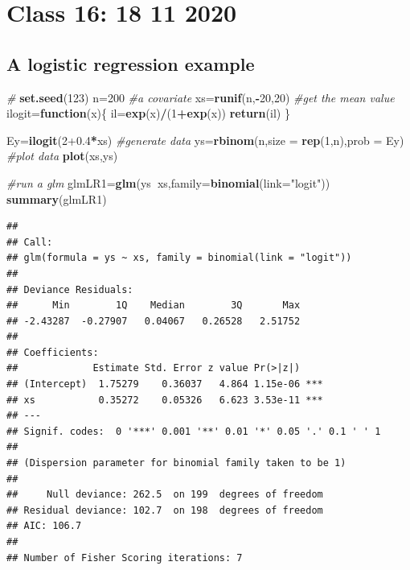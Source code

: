 \documentclass[
]{book}
\newenvironment{Shaded}{\begin{snugshade}}{\end{snugshade}}
\newcommand{\CommentTok}[1]{\textcolor[rgb]{0.56,0.35,0.01}{\textit{#1}}}
\newcommand{\ControlFlowTok}[1]{\textcolor[rgb]{0.13,0.29,0.53}{\textbf{#1}}}
\newcommand{\DataTypeTok}[1]{\textcolor[rgb]{0.13,0.29,0.53}{#1}}
\newcommand{\DecValTok}[1]{\textcolor[rgb]{0.00,0.00,0.81}{#1}}
\newcommand{\FloatTok}[1]{\textcolor[rgb]{0.00,0.00,0.81}{#1}}
\newcommand{\KeywordTok}[1]{\textcolor[rgb]{0.13,0.29,0.53}{\textbf{#1}}}
\newcommand{\NormalTok}[1]{#1}
\newcommand{\OperatorTok}[1]{\textcolor[rgb]{0.81,0.36,0.00}{\textbf{#1}}}
\newcommand{\StringTok}[1]{\textcolor[rgb]{0.31,0.60,0.02}{#1}}
\begin{document}
\hypertarget{aula16}{%
\chapter{Class 16: 18 11 2020}\label{aula16}}

\hypertarget{a-logistic-regression-example}{%
\section{A logistic regression example}\label{a-logistic-regression-example}}

\begin{Shaded}
\begin{Highlighting}[]
\CommentTok{#}
\KeywordTok{set.seed}\NormalTok{(}\DecValTok{123}\NormalTok{)}
\NormalTok{n=}\DecValTok{200}
\CommentTok{#a covariate}
\NormalTok{xs=}\KeywordTok{runif}\NormalTok{(n,}\OperatorTok{-}\DecValTok{20}\NormalTok{,}\DecValTok{20}\NormalTok{)}
\CommentTok{#get the mean value}
\NormalTok{ilogit=}\ControlFlowTok{function}\NormalTok{(x)\{}
\NormalTok{  il=}\KeywordTok{exp}\NormalTok{(x)}\OperatorTok{/}\NormalTok{(}\DecValTok{1}\OperatorTok{+}\KeywordTok{exp}\NormalTok{(x))}
\KeywordTok{return}\NormalTok{(il)}
\NormalTok{\}}

\NormalTok{Ey=}\KeywordTok{ilogit}\NormalTok{(}\DecValTok{2}\FloatTok{+0.4}\OperatorTok{*}\NormalTok{xs)}
\CommentTok{#generate data}
\NormalTok{ys=}\KeywordTok{rbinom}\NormalTok{(n,}\DataTypeTok{size =} \KeywordTok{rep}\NormalTok{(}\DecValTok{1}\NormalTok{,n),}\DataTypeTok{prob =}\NormalTok{ Ey)}
\CommentTok{#plot data}
\KeywordTok{plot}\NormalTok{(xs,ys)}


\CommentTok{#run a glm}
\NormalTok{glmLR1=}\KeywordTok{glm}\NormalTok{(ys}\OperatorTok{~}\NormalTok{xs,}\DataTypeTok{family=}\KeywordTok{binomial}\NormalTok{(}\DataTypeTok{link=}\StringTok{"logit"}\NormalTok{))}
\KeywordTok{summary}\NormalTok{(glmLR1)}
\end{Highlighting}
\end{Shaded}

\begin{verbatim}
## 
## Call:
## glm(formula = ys ~ xs, family = binomial(link = "logit"))
## 
## Deviance Residuals: 
##      Min        1Q    Median        3Q       Max  
## -2.43287  -0.27907   0.04067   0.26528   2.51752  
## 
## Coefficients:
##             Estimate Std. Error z value Pr(>|z|)    
## (Intercept)  1.75279    0.36037   4.864 1.15e-06 ***
## xs           0.35272    0.05326   6.623 3.53e-11 ***
## ---
## Signif. codes:  0 '***' 0.001 '**' 0.01 '*' 0.05 '.' 0.1 ' ' 1
## 
## (Dispersion parameter for binomial family taken to be 1)
## 
##     Null deviance: 262.5  on 199  degrees of freedom
## Residual deviance: 102.7  on 198  degrees of freedom
## AIC: 106.7
## 
## Number of Fisher Scoring iterations: 7
\end{verbatim}
\end{document}
